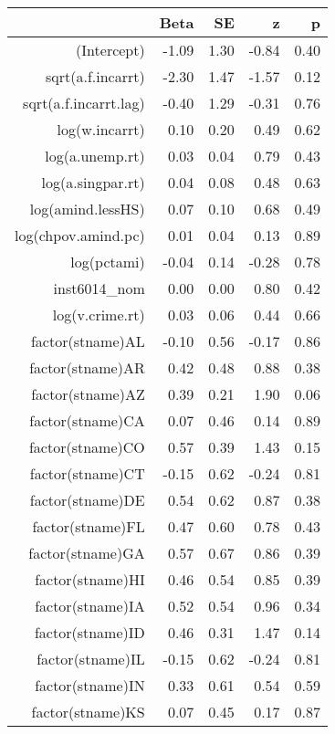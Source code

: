 \begin{table}[ht]
\centering
\begin{tabular}{rrrrr}
  \hline
 & Beta & SE & z & p \\ 
  \hline
(Intercept) & -1.09 & 1.30 & -0.84 & 0.40 \\ 
  sqrt(a.f.incarrt) & -2.30 & 1.47 & -1.57 & 0.12 \\ 
  sqrt(a.f.incarrt.lag) & -0.40 & 1.29 & -0.31 & 0.76 \\ 
  log(w.incarrt) & 0.10 & 0.20 & 0.49 & 0.62 \\ 
  log(a.unemp.rt) & 0.03 & 0.04 & 0.79 & 0.43 \\ 
  log(a.singpar.rt) & 0.04 & 0.08 & 0.48 & 0.63 \\ 
  log(amind.lessHS) & 0.07 & 0.10 & 0.68 & 0.49 \\ 
  log(chpov.amind.pc) & 0.01 & 0.04 & 0.13 & 0.89 \\ 
  log(pctami) & -0.04 & 0.14 & -0.28 & 0.78 \\ 
  inst6014\_nom & 0.00 & 0.00 & 0.80 & 0.42 \\ 
  log(v.crime.rt) & 0.03 & 0.06 & 0.44 & 0.66 \\ 
  factor(stname)AL & -0.10 & 0.56 & -0.17 & 0.86 \\ 
  factor(stname)AR & 0.42 & 0.48 & 0.88 & 0.38 \\ 
  factor(stname)AZ & 0.39 & 0.21 & 1.90 & 0.06 \\ 
  factor(stname)CA & 0.07 & 0.46 & 0.14 & 0.89 \\ 
  factor(stname)CO & 0.57 & 0.39 & 1.43 & 0.15 \\ 
  factor(stname)CT & -0.15 & 0.62 & -0.24 & 0.81 \\ 
  factor(stname)DE & 0.54 & 0.62 & 0.87 & 0.38 \\ 
  factor(stname)FL & 0.47 & 0.60 & 0.78 & 0.43 \\ 
  factor(stname)GA & 0.57 & 0.67 & 0.86 & 0.39 \\ 
  factor(stname)HI & 0.46 & 0.54 & 0.85 & 0.39 \\ 
  factor(stname)IA & 0.52 & 0.54 & 0.96 & 0.34 \\ 
  factor(stname)ID & 0.46 & 0.31 & 1.47 & 0.14 \\ 
  factor(stname)IL & -0.15 & 0.62 & -0.24 & 0.81 \\ 
  factor(stname)IN & 0.33 & 0.61 & 0.54 & 0.59 \\ 
  factor(stname)KS & 0.07 & 0.45 & 0.17 & 0.87 \\ 

\end{tabular}
\end{table}
